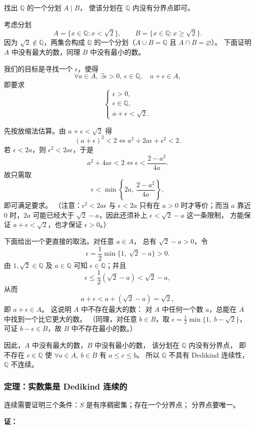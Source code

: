 \documentclass[UTF8,11pt]{ctexart}
\theoremstyle{cnthm}
\begin{document}
找出 $\mathbb Q$ 的一个分划 $A\mid B$，
使该分划在 $\mathbb Q$ 内没有分界点即可。

考虑分划
\[
A=\{x\in\mathbb Q:x<\sqrt2\},\qquad
B=\{x\in\mathbb Q:x\geq\sqrt2\}.
\]
因为 $\sqrt2\notin\mathbb Q$，两集合构成 $\mathbb Q$
的一个分划（$A\cup B=\mathbb Q$ 且 $A\cap B=\varnothing$）。
下面证明 $A$ 中没有最大的数，同理 $B$ 中没有最小的数。

我们的目标是寻找一个 $\epsilon$，使得
\[
\forall a\in A,\ \exists\epsilon>0,\ \epsilon\in\mathbb Q,\quad
a+\epsilon\in A,
\]
即要求
\[
\begin{cases}
\epsilon>0,\\
\epsilon\in\mathbb Q,\\
a+\epsilon<\sqrt2.
\end{cases}
\]

先按放缩法估算。由 $a+\epsilon<\sqrt2$ 得
\[
(a+\epsilon)^2<2
\iff a^2+2a\epsilon+\epsilon^2<2.
\]
若 $\epsilon<2a$，则 $\epsilon^2<2a\epsilon$，于是
\[
a^2+4a\epsilon<2
\iff \epsilon<\frac{2-a^2}{4a}.
\]
故只需取
\[
\epsilon<\min\left\{2a,\ \frac{2-a^2}{4a}\right\},
\]
即可满足要求。
（注意：$\epsilon^2<2a\epsilon$ 与 $\epsilon<2a$ 只有在
$a>0$ 时才等价；而当 $a$ 靠近 $0$ 时，$2a$ 可能已经大于
$\sqrt2-a$，因此还须补上 $\epsilon<\sqrt2-a$ 这一条限制，
方能保证 $a+\epsilon<\sqrt2$，也才保证 $\epsilon>0$。）

下面给出一个更直接的取法。对任意 $a\in A$，
总有 $\sqrt2-a>0$，令
\[
\epsilon=\frac12\min\{1,\ \sqrt2-a\}>0 .
\]
由 $1,\sqrt2\in\mathbb Q$ 及 $a\in\mathbb Q$ 可知
$\epsilon\in\mathbb Q$；并且
\[
\epsilon\leq\frac12(\sqrt2-a)<\sqrt2-a,
\]
从而
\[
a+\epsilon<a+(\sqrt2-a)=\sqrt2,
\]
即 $a+\epsilon\in A$。
这说明 $A$ 中不存在最大的数：
对 $A$ 中任何一个数 $a$，总能在 $A$ 中找到一个比它更大的数。
（同理，对任意 $b\in B$，取
$\epsilon=\frac12\min\{1,\ b-\sqrt2\}$，
可证 $b-\epsilon\in B$，故 $B$ 中不存在最小的数。）

因此，$A$ 中没有最大的数，$B$ 中没有最小的数，
该分划在 $\mathbb Q$ 内没有分界点，
即不存在 $c\in\mathbb Q$ 使
$\forall a\in A,\ b\in B$ 有 $a\leq c\leq b$。
所以 $\mathbb Q$ 不具有 Dedikind 连续性，$\mathbb Q$ 不连续。

\subsubsection*{定理：实数集是 Dedikind 连续的}

连续需要证明三个条件：$S$ 是有序稠密集；存在一个分界点；
分界点要唯一。

\noindent\textbf{证：}
\end{document}
